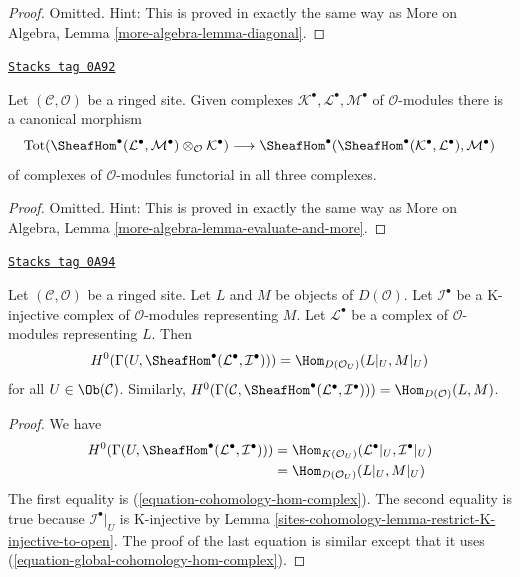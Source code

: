 \begin{proof}
Omitted. Hint: This is proved in exactly the same way as
More on Algebra, Lemma \ref{more-algebra-lemma-diagonal}.
\end{proof}

\begin{lemma}
\label{sites-cohomology-lemma-evaluate-and-more}
\href{https://stacks.math.columbia.edu/tag/0A92}{\texttt{Stacks tag 0A92}}

Let $(\mathcal{C}, \mathcal{O})$ be a ringed site. Given complexes
$\mathcal{K}^\bullet, \mathcal{L}^\bullet, \mathcal{M}^\bullet$
of $\mathcal{O}$-modules there is a canonical morphism
$$
\text{Tot}(\SheafHom^\bullet(\mathcal{L}^\bullet,
\mathcal{M}^\bullet) \otimes_\mathcal{O} \mathcal{K}^\bullet)
\longrightarrow
\SheafHom^\bullet(\SheafHom^\bullet(\mathcal{K}^\bullet,
\mathcal{L}^\bullet), \mathcal{M}^\bullet)
$$
of complexes of $\mathcal{O}$-modules functorial in all three complexes.
\end{lemma}

\begin{proof}
Omitted. Hint: This is proved in exactly the same way as
More on Algebra, Lemma \ref{more-algebra-lemma-evaluate-and-more}.
\end{proof}

\begin{lemma}
\label{sites-cohomology-lemma-RHom-into-K-injective}
\href{https://stacks.math.columbia.edu/tag/0A94}{\texttt{Stacks tag 0A94}}

Let $(\mathcal{C}, \mathcal{O})$ be a ringed site. Let $L$ and $M$
be objects of $D(\mathcal{O})$. Let $\mathcal{I}^\bullet$
be a K-injective complex of $\mathcal{O}$-modules representing $M$. Let
$\mathcal{L}^\bullet$ be a complex of $\mathcal{O}$-modules
representing $L$.
Then
$$
H^0(\Gamma(U, \SheafHom^\bullet(\mathcal{L}^\bullet, \mathcal{I}^\bullet))) =
\Hom_{D(\mathcal{O}_U)}(L|_U, M|_U)
$$
for all $U \in \Ob(\mathcal{C})$. Similarly,
$H^0(\Gamma(\mathcal{C},
\SheafHom^\bullet(\mathcal{L}^\bullet, \mathcal{I}^\bullet))) =
\Hom_{D(\mathcal{O})}(L, M)$.
\end{lemma}

\begin{proof}
We have
\begin{align*}
H^0(\Gamma(U, \SheafHom^\bullet(\mathcal{L}^\bullet, \mathcal{I}^\bullet)))
& =
\Hom_{K(\mathcal{O}_U)}(\mathcal{L}^\bullet|_U, \mathcal{I}^\bullet|_U) \\
& =
\Hom_{D(\mathcal{O}_U)}(L|_U, M|_U)
\end{align*}
The first equality is (\ref{equation-cohomology-hom-complex}).
The second equality is true because $\mathcal{I}^\bullet|_U$
is K-injective by Lemma \ref{sites-cohomology-lemma-restrict-K-injective-to-open}.
The proof of the last equation is similar except that it uses
(\ref{equation-global-cohomology-hom-complex}).
\end{proof}

